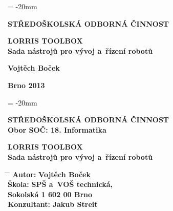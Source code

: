 \documentclass[12pt, a4paper, oneside]{article}
\newcommand{\B}{\textbf} %
\begin{document}

\pagestyle{empty} %
 
\voffset = -20mm %
\enlargethispage{60mm} %

\begin{center}
 
\Large \B{STŘEDOŠKOLSKÁ ODBORNÁ ČINNOST}

\vspace{60mm}

\huge %
\B{LORRIS TOOLBOX \\ Sada nástrojů pro vývoj a~řízení robotů}

\Large

\vspace{90mm}


\B{Vojtěch Boček} \\

\vspace{40mm}

\B{Brno 2013}


\end{center}

\newpage %

\voffset = -20mm %
\enlargethispage{60mm} %

\begin{center}

\Large \B{STŘEDOŠKOLSKÁ ODBORNÁ ČINNOST}  \\
\vspace{10mm}
 \normalsize 
\B{Obor SOČ: 18. Informatika}%

\vspace{45mm}

\LARGE %
\B{LORRIS TOOLBOX \\ Sada nástrojů pro vývoj a~řízení robotů}%
\end{center}  
\large

\vspace{50mm}


\begin{tabbing}
\hspace{10mm} \= \hspace{30mm}  \=   \kill %
  \> \B{Autor:}  \> \B{Vojtěch Boček}        \\[8mm] 
  \> \B{Škola:}   \> \B{SPŠ a~VOŠ technická, }     \\
  \>              \> \B{Sokolská 1 602 00 Brno}    \\[8mm]

  \> \B{Konzultant:} \> \B {Jakub Streit} 
\end{tabbing}
\end{document}
